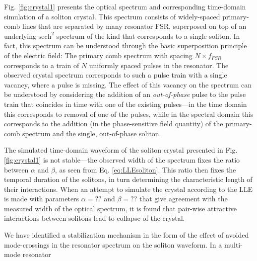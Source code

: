 Fig. \ref{fig:crystal1} presents the optical spectrum and corresponding time-domain simulation of a soliton crystal. This spectrum consists of widely-spaced primary-comb lines that are separated by many resonator FSR, superposed on top of an underlying $\mathrm{sech}^2$ spectrum of the kind that corresponds to a single soliton. In fact, this spectrum can be understood through the basic superposition principle of the electric field: The primary comb spectrum with spacing $N\times f_{FSR}$ corresponds to a train of $N$ uniformly spaced pulses in the resonator. The observed crystal spectrum corresponds to such a pulse train with a single vacancy, where a pulse is missing. The effect of this vacancy on the spectrum can be understood by considering the addition of an \textit{out-of-phase} pulse to the pulse train that coincides in time with one of the existing pulses---in the time domain this corresponds to removal of one of the pulses, while in the spectral domain this corresponds to the addition (in the phase-sensitive field quantity) of the primary-comb spectrum and the single, out-of-phase soliton. 

The simulated time-domain waveform of the soliton crystal presented in Fig. \ref{fig:crystal1} is not stable---the observed width of the spectrum fixes the ratio between $\alpha$ and $\beta$, as seen from Eq. \ref{eq:LLEsoliton}. This ratio then fixes the temporal duration of the solitons, in turn determining the characteristic length of their interactions. When an attempt to simulate the crystal according to the LLE is made with parameters $\alpha=??$ and $\beta=??$ that give agreement with the measured width of the optical spectrum, it is found that pair-wise attractive interactions between solitons lead to collapse of the crystal.

We have identified a stabilization mechanism in the form of the effect of avoided mode-crossings in the resonator spectrum on the soliton waveform. In a multi-mode resonator 